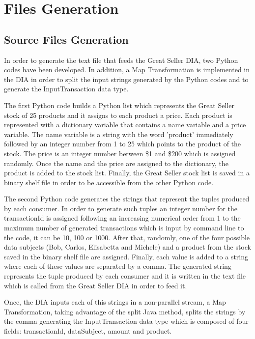 \section{Files Generation}

\subsection{Source Files Generation}
In order to generate the text file that feeds the Great Seller DIA, two Python codes have been developed. In addition, a Map Transformation is implemented in the DIA in order to split the input strings generated by the Python codes and to generate the InputTransaction data type.

The first Python code builds a Python list which represents the Great Seller stock of 25 products and it assigns to each product a price. Each product is represented with a dictionary variable that contains a name variable and a price variable. The name variable is a string with the word 'product' immediately followed by an integer number from 1 to 25 which points to the product of the stock. The price is an integer number between \$1 and \$200 which is assigned randomly. Once the name and the price are assigned to the dictionary, the product is added to the stock list. Finally, the Great Seller stock list is saved in a binary shelf file in order to be accessible from the other Python code.

The second Python code generates the strings that represent the tuples produced by each consumer. In order to generate such tuples an integer number for the transactionId is assigned following an increasing numerical order from 1 to the maximum number of generated transactions which is input by command line to the code, it can be 10, 100 or 1000. After that, randomly, one of the four possible data subjects (Bob, Carlos, Elisabetta and Michele) and a product from the stock saved in the binary shelf file are assigned. Finally, each value is added to a string where each of these values are separated by a comma. The generated string represents the tuple produced by each consumer and it is written in the text file which is called from the Great Seller DIA in order to feed it.

Once, the DIA inputs each of this strings in a non-parallel stream, a Map Transformation, taking advantage of the split Java method, splits the strings by the comma generating the InputTransaction data type which is composed of four fields: transactionId, dataSubject, amount and product.


